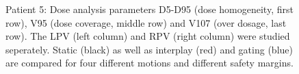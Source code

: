 \documentclass[type=dr, dr=rernat, accentcolor=tud7b,colorbacktitle, bigchapter, openright, twoside, 12pt ]{tudthesis}
\begin{document}
\begin{figure}[H]
{ }
\caption{Patient 5: Dose analysis parameters D5-D95 (dose homogeneity, first row), V95 (dose coverage, middle row) and V107 (over dosage, last row). 
The LPV (left column) and RPV (right column) were studied seperately. Static (black) as well as interplay (red) and gating (blue) 
are compared for four different motions and different safety margins.}
\label{static_interplay_gating_Pat05}
\end{figure}

\newpage
\end{document}
